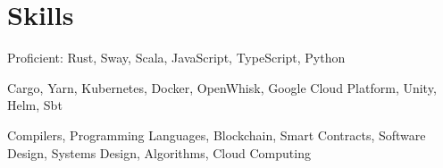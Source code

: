 \section{Skills}

%
{}%
{}%
{\small Proficient: Rust, Sway, Scala, JavaScript, TypeScript, Python%
\normalsize}%
{}

%
{}%
{}%
{\small Cargo, Yarn, Kubernetes, Docker, OpenWhisk, Google Cloud Platform, Unity, Helm, Sbt \normalsize}%
{}

%
{}%
{}%
{\small Compilers, Programming Languages, Blockchain, Smart Contracts,
Software Design, Systems Design, Algorithms, Cloud Computing\normalsize}%
{}
